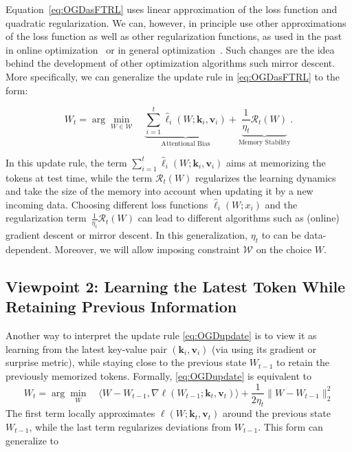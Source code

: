 \documentclass{article}
\newcommand{\citep}{\parencite}
\newcommand{\vk}[0]{\mathbf{k}}
\newcommand{\vvv}[0]{\mathbf{v}}
\newcommand{\cW}[0]{\mathcal{W}}
\newcommand{\undermath}[2]{\underset{#1}{\underbrace{#2}}}
\theoremstyle{plain}
\theoremstyle{definition}
\theoremstyle{remark}
\begin{document}
Equation~\eqref{eq:OGDasFTRL} uses linear approximation of the loss function and quadratic regularization. We can, however, in principle use other approximations of the loss function as well as other regularization functions, as used in the past in online optimization~\citep{shalev2012online,hazan2016introduction} or in general optimization~\citep{mairal2015incremental,razaviyayn2013unified}. Such changes are the idea behind the development of other optimization algorithms such  mirror descent. More specifically, we can generalize the update rule in \eqref{eq:OGDasFTRL} to the form:

\begin{equation}
\label{eq:Viewpoint1-OnlineRegression}
\tag{FTRL Viewpoint}
W_{t} = \arg\min_{W\in \cW}\quad \undermath{\text{Attentional Bias}}{\sum_{i=1}^t \widehat{\ell}_i(W;\vk_i, \vvv_i)}  + \undermath{\text{Memory Stability}}{\frac{1}{\eta_t} \mathcal{R}_t(W)}.
\end{equation}

In this update rule, the  term $\sum_{i=1}^t \widehat{\ell}_i(W;\vk_i, \vvv_i)$ aims at memorizing the tokens at test time, while the term $\mathcal{R}_t(W)$ regularizes the learning dynamics and take the size of the memory into account when updating it by a new incoming data. 
Choosing different loss functions $\widehat{\ell}_i(W;x_i)$ and the regularization term~$\frac{1}{\eta_t} \mathcal{R}_t(W)$ can lead to different algorithms such as (online) gradient descent or  mirror descent. In this generalization,  $\eta_t$ to can be data-dependent. Moreover, we will allow imposing constraint $\cW$ on the choice $W$.







\subsection{Viewpoint 2: Learning the Latest Token While Retaining Previous Information}
Another way to interpret the update rule \eqref{eq:OGDupdate} is to view it as learning from the latest key-value pair $(\vk_i, \vvv_i)$ (via using its gradient or surprise metric), while staying close to the previous state $W_{t-1}$ to retain the previously memorized tokens. Formally, \eqref{eq:OGDupdate} is equivalent to
\[
W_{t} = \arg\min_{W}\quad  \langle W-W_{t-1} , \nabla \ell(W_{t-1};\vk_t, \vvv_t) \rangle  + \frac{1}{2\eta_t} \|W - W_{t-1}\|_2^2
\]
The first term locally approximates $\ell(W;\vk_t, \vvv_t)$ around the previous state $W_{t-1}$, while the last term regularizes  deviations from $W_{t-1}$. This form can generalize to 
\end{document}
